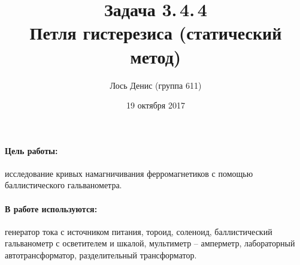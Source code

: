 \documentclass[12pt]{article}
\title{{\bf Задача 3.\,4.\,4 \\ Петля гистерезиса (статический метод)}}
\author{Лось Денис (группа 611)}
\date{19 октября 2017}
\begin{document}
\maketitle

\paragraph{Цель работы:} исследование кривых намагничивания ферромагнетиков с помощью баллистического гальванометра.

\paragraph{В работе используются:} генератор тока с источником питания, тороид, соленоид, баллистический гальванометр с осветителем и шкалой, мультиметр -- амперметр, лабораторный автотрансформатор, разделительный трансформатор.
\end{document}
